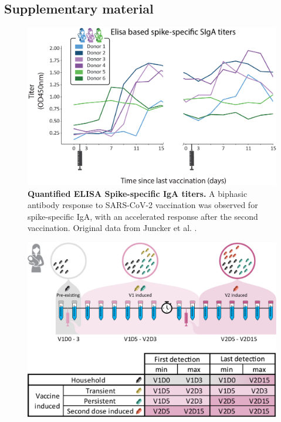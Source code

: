 \clearpage
\begin{subappendices}
  \beginsupplement

  \section{Supplementary material}
  \begin{figure}[!htb]
    \center
    \includegraphics[]{Chapter.4/Figures/fs1.png}
    \caption{\textbf{Quantified ELISA Spike-specific IgA titers.} A biphasic antibody response to SARS-CoV-2 vaccination was observed for spike-specific IgA, with an accelerated response after the second vaccination. Original data from Juncker et al. \cite{juncker2022comparing}.}
    \label{fig:figs4.1}
  \end{figure}
  \begin{figure}[!htb]
    \center
    \includegraphics[]{Chapter.4/Figures/fs2.png}

\end{figure}
\end{subappendices}
